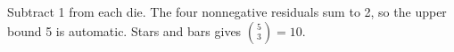 Subtract 1 from each die. The four nonnegative residuals sum to 2, so the upper bound 5 is automatic. Stars and bars gives $\binom53=\boxed{10}$.
